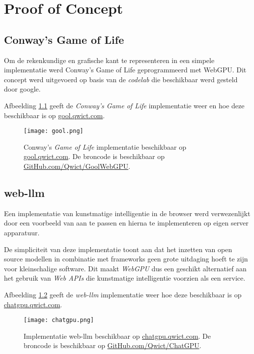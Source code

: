 \chapter{Proof of Concept}
\label{ch:poc}

\section{Conway's Game of Life}

Om de rekenkundige en grafische kant te representeren in een simpele implementatie werd Conway's Game of Life geprogrammeerd met WebGPU. Dit concept werd uitgevoerd op basis van de \textit{codelab} die beschikbaar werd gesteld door google. \autocite{google2023, Qwict2024}

\bigbreak{}

Afbeelding \ref{fig:Conway's Game of Life} geeft de \textit{Conway's Game of Life} implementatie weer en hoe deze beschikbaar is op \href{https://gool.qwict.com}{gool.qwict.com}.

\bigbreak{}

\begin{figure}
    \texttt{[image: gool.png]}
    \caption[Conway's \textit{Game of Life} implementatie  \autocite{Qwict2024}]{
        Conway's \textit{Game of Life} implementatie beschikbaar op \href{https://gool.qwict.com}{gool.qwict.com}. De broncode is beschikbaar op \href{https://github.com/qwict/GoolWebGPU}{GitHub.com/Qwict/GoolWebGPU}.
    }
    \label{fig:Conway's Game of Life}
\end{figure}

\section{web-llm}

Een implementatie van kunstmatige intelligentie in de browser werd verwezenlijkt door een voorbeeld van \textcite{mlcai2023} aan te passen en hierna te implementeren op eigen server apparatuur. \autocite{Qwict2024a}

\bigbreak{}

De simpliciteit van deze implementatie toont aan dat het inzetten van open source modellen in combinatie met frameworks geen grote uitdaging hoeft te zijn voor kleinschalige software. Dit maakt \textit{WebGPU} dus een geschikt alternatief aan het gebruik van \textit{Web APIs} die kunstmatige intelligentie voorzien als een service.

Afbeelding \ref{fig:Implementatie web-llm} geeft de \textit{web-llm} implementatie weer hoe deze beschikbaar is op \href{https://chatgpu.qwict.com}{chatgpu.qwict.com}. \autocite{Qwict2024a}

\begin{figure}
    \texttt{[image: chatgpu.png]}
    \caption[Implementatie web-llm \autocite{Qwict2024a}]{
        Implementatie web-llm beschikbaar op \href{https://chatgpu.qwict.com}{chatgpu.qwict.com}. De broncode is beschikbaar op \href{https://github.com/qwict/chatgpu}{GitHub.com/Qwict/ChatGPU}. \autocite{Qwict2024a}
    }
    \label{fig:Implementatie web-llm}
\end{figure}